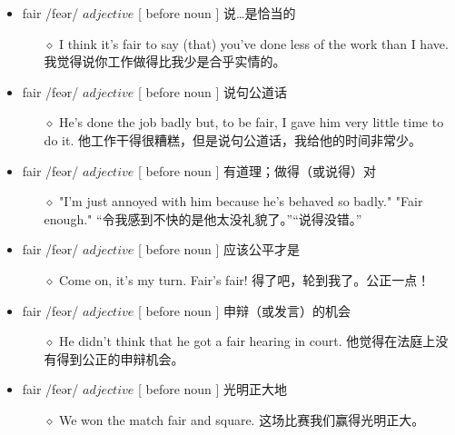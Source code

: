 \documentclass[a4paper,top=2.5cm,buttom=2.5cm10.5pt]{book}
\begin{document}
\begin{itemize}
\item fair /feər/ $ adjective $ [ before noun ] 说…是恰当的
\begin{itemize}
\item[$\diamond$] I think it's fair to say (that) you've done less of the work than I have.
我觉得说你工作做得比我少是合乎实情的。
\end{itemize}
\end{itemize}
\begin{itemize}
\item fair /feər/ $ adjective $ [ before noun ] 说句公道话
\begin{itemize}
\item[$\diamond$] He's done the job badly but, to be fair, I gave him very little time to do it.
他工作干得很糟糕，但是说句公道话，我给他的时间非常少。
\end{itemize}
\end{itemize}
\begin{itemize}
\item fair /feər/ $ adjective $ [ before noun ] 有道理；做得（或说得）对
\begin{itemize}
\item[$\diamond$] "I'm just annoyed with him because he's behaved so badly." "Fair enough."
“令我感到不快的是他太没礼貌了。”“说得没错。”
\end{itemize}
\end{itemize}
\begin{itemize}
\item fair /feər/ $ adjective $ [ before noun ] 应该公平才是
\begin{itemize}
\item[$\diamond$] Come on, it's my turn. Fair's fair!
得了吧，轮到我了。公正一点！
\end{itemize}
\end{itemize}
\begin{itemize}
\item fair /feər/ $ adjective $ [ before noun ] 申辩（或发言）的机会
\begin{itemize}
\item[$\diamond$] He didn't think that he got a fair hearing in court.
他觉得在法庭上没有得到公正的申辩机会。
\end{itemize}
\end{itemize}
\begin{itemize}
\item fair /feər/ $ adjective $ [ before noun ] 光明正大地
\begin{itemize}
\item[$\diamond$] We won the match fair and square.
这场比赛我们赢得光明正大。
\end{itemize}
\end{itemize}
\end{document}
